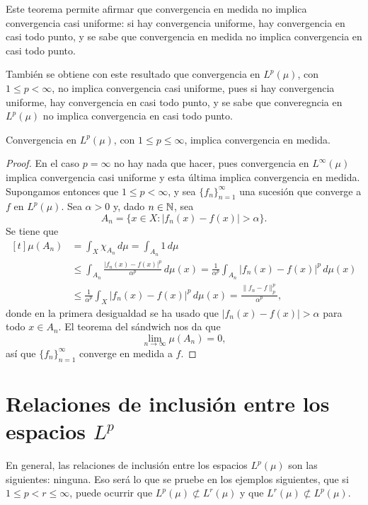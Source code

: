 \documentclass[a4paper, 11pt, oneside]{report}
\begin{document}
Este teorema permite afirmar que convergencia en medida no implica convergencia casi uniforme: si hay convergencia uniforme, hay convergencia en casi todo punto, y se sabe que convergencia en medida no implica convergencia en casi todo punto.

También se obtiene con este resultado que convergencia en $L^p(\mu)$, con $1 \leq p < \infty$, no implica convergencia casi uniforme, pues si hay convergencia uniforme, hay convergencia en casi todo punto, y se sabe que converegncia en $L^p(\mu)$ no implica convergencia en casi todo punto.

\begin{theorem}
  Convergencia en $L^p(\mu)$, con $1 \leq p \leq \infty$, implica convergencia en medida.
\end{theorem}

\begin{proof}
  En el caso $p = \infty$ no hay nada que hacer, pues convergencia en $L^\infty(\mu)$ implica convergencia casi uniforme y esta última implica convergencia en medida. Supongamos entonces que $1 \leq p < \infty$, y sea $\{f_n\}_{n=1}^\infty$ una sucesión que converge a $f$ en $L^p(\mu)$. Sea $\alpha > 0$ y, dado $n \in \mathbb N$, sea
  \[A_n = \{x \in X \colon |f_n(x)-f(x)| > \alpha\}.\]
  Se tiene que
  \[\begin{aligned}[t]
    \mu(A_n) &= \int_X \chi_{A_n} \, d\mu = \int_{A_n} 1 \, d\mu \\
    &\leq \int_{A_n} \frac{|f_n(x)-f(x)|^p}{\alpha^p} \, d\mu(x) = \frac{1}{\alpha^p} \int_{A_n} |f_n(x)-f(x)|^p \, d\mu(x) \\
    &\leq \frac{1}{\alpha^p} \int_X |f_n(x)-f(x)|^p \, d\mu(x) = \frac{\|f_n-f\|_p^p}{\alpha^p},
  \end{aligned}\]
  donde en la primera desigualdad se ha usado que $|f_n(x)-f(x)|>\alpha$ para todo $x \in A_n$. El teorema del sándwich nos da que \[\lim_{n \to \infty} \mu(A_n) = 0,\]
  así que $\{f_n\}_{n=1}^\infty$ converge en medida a $f$.
\end{proof}

\section[Relaciones de inclusión entre los espacios \texorpdfstring{$L^p$}{Lp}]{Relaciones de inclusión entre los espacios \texorpdfstring{\boldmath$L^p$}{Lp}}

En general, las relaciones de inclusión entre los espacios $L^p(\mu)$ son las siguientes: ninguna. Eso será lo que se pruebe en los ejemplos siguientes, que si $1 \leq p < r \leq \infty$, puede ocurrir que $L^p(\mu) \not\subset L^r(\mu)$ y que $L^r(\mu) \not\subset L^p(\mu)$.
\end{document}
